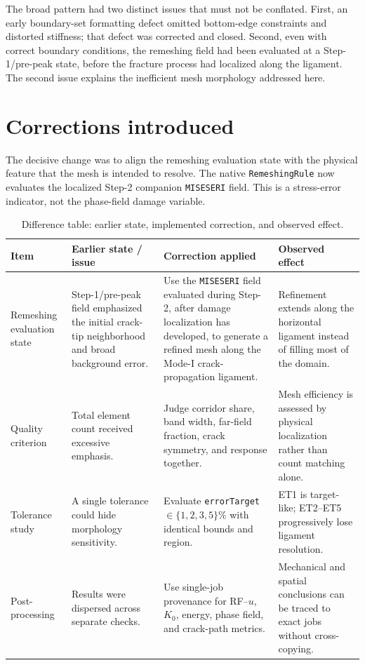 \documentclass[10pt,a4paper]{article}
\begin{document}
The broad pattern had two distinct issues that must not be conflated. First, an early boundary-set formatting defect omitted bottom-edge constraints and distorted stiffness; that defect was corrected and closed. Second, even with correct boundary conditions, the remeshing field had been evaluated at a Step-1/pre-peak state, before the fracture process had localized along the ligament. The second issue explains the inefficient mesh morphology addressed here.

\clearpage
\section{Corrections introduced}

The decisive change was to align the remeshing evaluation state with the physical feature that the mesh is intended to resolve. The native \texttt{RemeshingRule} now evaluates the localized Step-2 companion \texttt{MISESERI} field. This is a stress-error indicator, not the phase-field damage variable.

\begin{table}[H]
\centering
\caption{Difference table: earlier state, implemented correction, and observed effect.}
\footnotesize
\begin{tabularx}{\textwidth}{L{2.6cm}Y Y Y}
\toprule
Item & Earlier state / issue & Correction applied & Observed effect \\
\midrule
Remeshing evaluation state & Step-1/pre-peak field emphasized the initial crack-tip neighborhood and broad background error. & Use the \texttt{MISESERI} field evaluated during Step-2, after damage localization has developed, to generate a refined mesh along the Mode-I crack-propagation ligament. & Refinement extends along the horizontal ligament instead of filling most of the domain. \\
Quality criterion & Total element count received excessive emphasis. & Judge corridor share, band width, far-field fraction, crack symmetry, and response together. & Mesh efficiency is assessed by physical localization rather than count matching alone. \\
Tolerance study & A single tolerance could hide morphology sensitivity. & Evaluate \texttt{errorTarget} $\in\{1,2,3,5\}\%$ with identical bounds and region. & ET1 is target-like; ET2--ET5 progressively lose ligament resolution. \\
Post-processing & Results were dispersed across separate checks. & Use single-job provenance for RF--$u$, $K_0$, energy, phase field, and crack-path metrics. & Mechanical and spatial conclusions can be traced to exact jobs without cross-copying. \\
\bottomrule
\end{tabularx}
\end{table}
\end{document}
